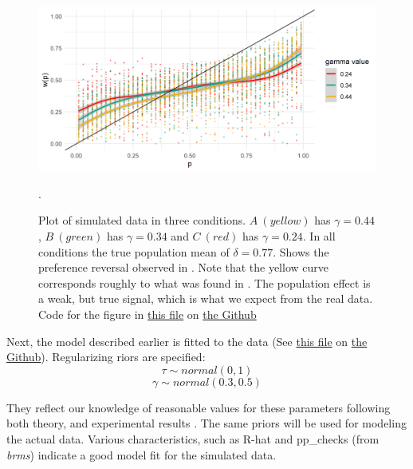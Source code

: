 \documentclass[12pt]{article}
\begin{document}
\begin{figure}[H]
	\includegraphics[width = \linewidth]{../Figures/simulated.png}
	\caption{Plot of simulated data in three
		conditions. $A \: (yellow)$ has
		$\gamma = 0.44$,
		$B \: (green)$ has $\gamma = 0.34$ and
		$C \: (red)$ has $\gamma = 0.24$.
		In all conditions
		the true population mean of
		$\delta = 0.77$. Shows the preference
		reversal observed in
	\textcite{rottenstreich2001money}. Note
	that the yellow curve corresponds
	roughly to what was found in
	\textcite{gonzalez1999shape}.
	The population effect is a
	weak, but true signal, which is
what we expect from the real data. Code for the figure in
		\href{https://github.com/victor-m-p/BayesianDecisionWeights/blob/main/Code/2_check_simulated.Rmd}{this
		file} on
		\href{https://github.com/victor-m-p/BayesianDecisionWeights}{the
	Github}}.
\end{figure}

Next, the model described earlier is fitted
to the data (See
\href{https://github.com/victor-m-p/BayesianDecisionWeights/blob/main/Code/3_toy_model.Rmd}{this
file} on \href{https://github.com/victor-m-p/BayesianDecisionWeights}{the
Github}). Regularizing riors are specified:
\[
	\tau \sim normal(0, 1)
\]
\[
	\gamma \sim normal(0.3, 0.5)
\]

They reflect our knowledge of reasonable values for
these parameters following both theory, and
experimental results \autocite{gonzalez1999shape}.
The same priors will be used for
modeling the actual data. Various characteristics,
such as R-hat and pp\_checks (from \emph{brms})
indicate a good model fit for the simulated data. \\
\end{document}
